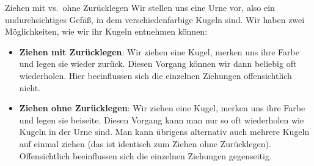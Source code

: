 \begin{bla}{Ziehen mit vs.\ ohne Zurücklegen}
  Wir stellen uns eine Urne vor, also ein undurchsichtiges Gefäß, in dem
  verschiedenfarbige Kugeln sind.
  Wir haben zwei Möglichkeiten, wie wir ihr Kugeln entnehmen können:
  \begin{itemize}
    \item \textbf{Ziehen mit Zurücklegen}: Wir ziehen eine Kugel, merken uns ihre
    Farbe und legen sie wieder zurück. Diesen Vorgang können wir dann beliebig
    oft wiederholen. Hier beeinflussen sich die einzelnen Ziehungen offensichtlich nicht.

    \item \textbf{Ziehen ohne Zurücklegen}: Wir ziehen eine Kugel, merken uns ihre
    Farbe und legen sie beiseite. Diesen Vorgang kann man nur so oft wiederholen wie
    Kugeln in der Urne sind. Man kann übrigens alternativ auch mehrere Kugeln auf einmal
    ziehen (das ist identisch zum Ziehen ohne Zurücklegen). Offensichtlich beeinflussen sich die einzelnen Ziehungen gegenseitig.
  \end{itemize}
\end{bla}
